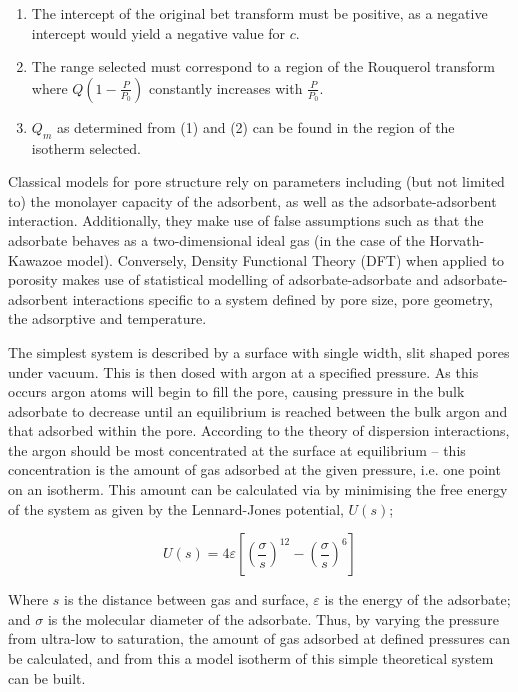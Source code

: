 	\begin{enumerate}[label=(\arabic*)]
		\item The intercept of the original \acrshort{bet} transform must be positive, as a negative intercept would yield a negative value for $c$.
		\item The range selected must correspond to a region of the Rouquerol transform where $Q \left(1 - \frac{P}{P_0} \right)$ constantly increases with $\frac{P}{P_0}$.
		\item $Q_m$ as determined from (1) and (2) can be found in the region of the isotherm selected.\citep{Rouquerol2007Is} 
	\end{enumerate}

Classical models for pore structure rely on parameters including (but not limited to) the monolayer capacity of the \gls{adsorbent}, as well as the \gls{adsorbate}-\gls{adsorbent} interaction. Additionally, they make use of false assumptions such as that the \gls{adsorbate} behaves as a two-dimensional ideal gas (in the case of the Horvath-Kawazoe model). Conversely, Density Functional Theory (DFT) when applied to porosity makes use of statistical modelling of \gls{adsorbate}-\gls{adsorbate} and \gls{adsorbate}-\gls{adsorbent} interactions specific to a system defined by pore size, pore geometry, the adsorptive and temperature.

The simplest system is described by a surface with single width, slit shaped pores under vacuum. This is then dosed with argon at a specified pressure. As this occurs argon atoms will begin to fill the pore, causing pressure in the bulk \gls{adsorbate} to decrease until an equilibrium is reached between the bulk argon and that adsorbed within the pore. According to the theory of dispersion interactions, the argon should be most concentrated at the surface at equilibrium – this concentration is the amount of gas adsorbed at the given pressure, i.e. one point on an isotherm. This amount can be calculated via by minimising the free energy of the system as given by the Lennard-Jones potential, $U(s)$;

\begin{equation}
U(s) = 4\varepsilon \left[ \left(\frac{\sigma}{s}\right)^{12} -  \left(\frac{\sigma}{s}\right)^{6} \right]
\end{equation}

Where $s$ is the distance between gas and surface, $\varepsilon$ is the energy of the \gls{adsorbate}; and $\sigma$ is the molecular diameter of the \gls{adsorbate}.  Thus, by varying the pressure from ultra-low to saturation, the amount of gas adsorbed at defined pressures can be calculated, and from this a model isotherm of this simple theoretical system can be built. 

